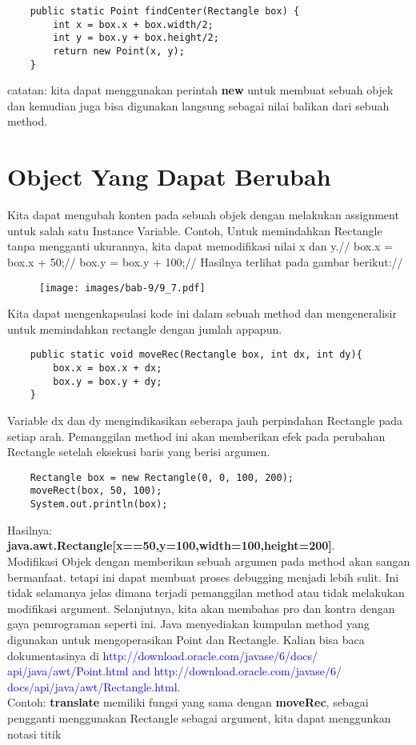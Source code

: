 \begin{lstlisting}
	public static Point findCenter(Rectangle box) {
		int x = box.x + box.width/2;
		int y = box.y + box.height/2;
		return new Point(x, y);
	}
\end{lstlisting}

catatan: kita dapat menggunakan perintah \textbf{new} untuk membuat sebuah objek dan kemudian juga bisa digunakan langsung sebagai nilai balikan dari sebuah method.

\section{Object Yang Dapat Berubah}
Kita dapat mengubah konten pada sebuah objek dengan melakukan assignment untuk salah satu Instance Variable. Contoh, Untuk memindahkan Rectangle tanpa mengganti ukurannya, kita dapat memodifikasi nilai x dan y.//
	box.x = box.x + 50;//
	box.y = box.y + 100;//
Hasilnya terlihat pada gambar berikut://
\begin{figure}[H]
	\centering \texttt{[image: images/bab-9/9\_7.pdf]}
\end{figure}
Kita dapat mengenkapsulasi kode ini dalam sebuah method dan mengeneralisir untuk memindahkan rectangle dengan jumlah appapun.
\begin{lstlisting}
	public static void moveRec(Rectangle box, int dx, int dy){
		box.x = box.x + dx;
		box.y = box.y + dy;
	}
\end{lstlisting}
Variable dx dan dy mengindikasikan seberapa jauh perpindahan Rectangle pada setiap arah. Pemanggilan method ini akan memberikan efek pada perubahan Rectangle setelah eksekusi baris yang berisi argumen.
\begin{lstlisting}
	Rectangle box = new Rectangle(0, 0, 100, 200);
	moveRect(box, 50, 100);
	System.out.println(box);
\end{lstlisting}
Hasilnya: \\ 
\textbf{java.awt.Rectangle[x==50,y=100,width=100,height=200]}. \\ 
Modifikasi Objek dengan memberikan sebuah argumen pada method akan sangan bermanfaat. tetapi ini dapat membuat proses debugging menjadi lebih sulit. Ini tidak selamanya jelas dimana terjadi pemanggilan method atau tidak melakukan modifikasi argument. Selanjutnya, kita akan membahas pro dan kontra dengan gaya pemrograman seperti ini.
Java menyediakan kumpulan method yang digunakan untuk mengoperasikan Point dan Rectangle. Kalian bisa baca dokumentasinya di \textcolor{blue}{http://download.oracle.com/javase/6/docs/ api/java/awt/Point.html and http://download.oracle.com/javase/6/ docs/api/java/awt/Rectangle.html.}
\\
Contoh: \textbf{translate} memiliki fungsi yang sama dengan \textbf{moveRec}, sebagai pengganti menggunakan Rectangle sebagai argument, kita dapat menggunkan notasi titik 
	
